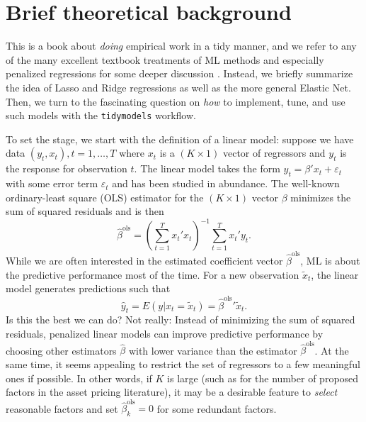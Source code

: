 \documentclass[
]{book}
\begin{document}
\hypertarget{brief-theoretical-background}{%
\section{Brief theoretical background}\label{brief-theoretical-background}}

This is a book about \emph{doing} empirical work in a tidy manner, and we refer to any of the many excellent textbook treatments of ML methods and especially penalized regressions for some deeper discussion \citep[e.g.,][\citet{Hastie2013}, \citet{DePrado2018}]{Hastie2009}. Instead, we briefly summarize the idea of Lasso and Ridge regressions as well as the more general Elastic Net. Then, we turn to the fascinating question on \emph{how} to implement, tune, and use such models with the \texttt{tidymodels} workflow.

To set the stage, we start with the definition of a linear model: suppose we have data \((y_t, x_t), t = 1,\ldots, T\) where \(x_t\) is a \((K \times 1)\) vector of regressors and \(y_t\) is the response for observation \(t\).
The linear model takes the form \(y_t = \beta' x_t + \varepsilon_t\) with some error term \(\varepsilon_t\) and has been studied in abundance. The well-known ordinary-least square (OLS) estimator for the \((K \times 1)\) vector \(\beta\) minimizes the sum of squared residuals and is then \[\hat{\beta}^\text{ols} = \left(\sum\limits_{t=1}^T x_t'x_t\right)^{-1} \sum\limits_{t=1}^T x_t'y_t.\]
While we are often interested in the estimated coefficient vector \(\hat\beta^\text{ols}\), ML is about the predictive performance most of the time. For a new observation \(\tilde{x}_t\), the linear model generates predictions such that \[\hat y_t = E\left(y|x_t = \tilde x_t\right) = \hat\beta^\text{ols}{}' \tilde x_t.\]
Is this the best we can do?
Not really: Instead of minimizing the sum of squared residuals, penalized linear models can improve predictive performance by choosing other estimators \(\hat{\beta}\) with lower variance than the estimator \(\hat\beta^\text{ols}\).
At the same time, it seems appealing to restrict the set of regressors to a few meaningful ones if possible. In other words, if \(K\) is large (such as for the number of proposed factors in the asset pricing literature), it may be a desirable feature to \emph{select} reasonable factors and set \(\hat\beta^{\text{ols}}_k = 0\) for some redundant factors.
\end{document}

